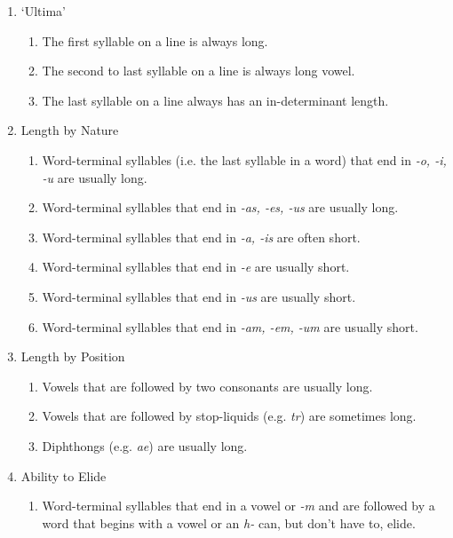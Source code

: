 \documentclass[12pt]{article}
\begin{document}
\begin{enumerate}

\item `Ultima'
\begin{enumerate}
\item The first syllable on a line is always long. 
\item The second to last syllable on a line is always long vowel.
\item The last syllable on a line always has an in-determinant length. 
\end{enumerate}

\item Length by Nature
\begin{enumerate}
\item Word-terminal syllables (i.e. the last syllable in a word) that end in \emph{-o, -i, -u} are usually long. 
\item Word-terminal syllables that end in \emph{-as, -es, -us} are usually long. 
\item Word-terminal syllables that end in \emph{-a, -is} are often short. 
\item Word-terminal syllables that end in \emph{-e} are usually short.
\item Word-terminal syllables that end in \emph{-us} are usually short. 
\item Word-terminal syllables that end in \emph{-am, -em, -um} are usually short. 
\end{enumerate}

\item Length by Position
\begin{enumerate}
\item Vowels that are followed by two consonants are usually long.
\item Vowels that are followed by stop-liquids (e.g. \emph{tr}) are sometimes long.
\item Diphthongs (e.g. \emph{ae}) are usually long. 
\end{enumerate}

\item Ability to Elide
\begin{enumerate}
\item Word-terminal syllables that end in a vowel or \emph{-m} and are followed by a word that begins with a vowel or an \emph{h-} can, but don't have to, elide.
\end{enumerate}

\end{enumerate}
\end{document}
